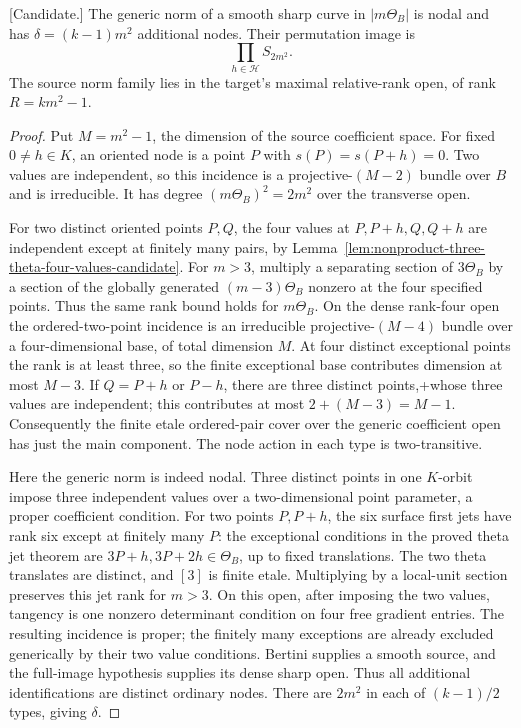 \begin{lemma}
\label{lem:good-theta-uniform-node-product-candidate}
\textup{[Candidate.]}
The generic norm of a smooth sharp curve in $|m\Theta_B|$ is nodal
and has $\delta=(k-1)m^2$ additional nodes. Their permutation
image is
\[
                       \prod_{h\in\mathcal H}S_{2m^2}.
\]
The source norm family lies in the target's maximal relative-rank
open, of rank $R=km^2-1$.
\end{lemma}
\begin{proof}
Put $M=m^2-1$, the dimension of the source coefficient space.
For fixed $0\ne h\in K$, an oriented node is a point $P$ with
$s(P)=s(P+h)=0$. Two values are independent, so this incidence
is a projective-$(M-2)$ bundle over $B$ and is irreducible.
It has degree $(m\Theta_B)^2=2m^2$ over the transverse open.

For two distinct oriented points $P,Q$, the four values at
$P,P+h,Q,Q+h$ are independent except at finitely many pairs,
by Lemma~\ref{lem:nonproduct-three-theta-four-values-candidate}.
For $m>3$, multiply a separating section of $3\Theta_B$ by a
section of the globally generated $(m-3)\Theta_B$ nonzero at
the four specified points. Thus the same rank bound holds for
$m\Theta_B$. On the dense rank-four open the ordered-two-point
incidence is an irreducible projective-$(M-4)$ bundle over a
four-dimensional base, of total dimension $M$.
At four distinct exceptional points the rank is at least three,
so the finite exceptional base contributes dimension at most
$M-3$. If $Q=P+h$ or $P-h$, there are three distinct points,+whose three values are independent; this contributes at most
$2+(M-3)=M-1$. Consequently the finite etale ordered-pair cover
over the generic coefficient open has just the main component.
The node action in each type is two-transitive.

Here the generic norm is indeed nodal. Three distinct points in
one $K$-orbit impose three independent values over a two-dimensional
point parameter, a proper coefficient condition. For two points
$P,P+h$, the six surface first jets have rank six except at
finitely many $P$: the exceptional conditions in the proved theta
jet theorem are $3P+h,3P+2h\in\Theta_B$, up to fixed translations.
The two theta translates are distinct, and $[3]$ is finite etale.
Multiplying by a local-unit section preserves this jet rank for
$m>3$. On this open, after imposing the two values, tangency is
one nonzero determinant condition on four free gradient entries.
The resulting incidence is proper; the finitely many exceptions
are already excluded generically by their two value conditions.
Bertini supplies a smooth source, and the full-image hypothesis
supplies its dense sharp open. Thus all additional identifications
are distinct ordinary nodes. There are $2m^2$ in each of
$(k-1)/2$ types, giving $\delta$.


\end{proof}
